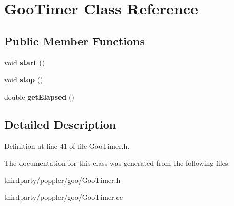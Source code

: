 \hypertarget{class_goo_timer}{}\section{Goo\+Timer Class Reference}
\label{class_goo_timer}
\subsection*{Public Member Functions}
\begin{DoxyCompactItemize}
\item 
\mbox{\label{class_goo_timer_aac9f117fa4582dadb5240af2f3c1c52c}} 
void {\bfseries start} ()
\item 
\mbox{\label{class_goo_timer_af578544e4f4e170de32ddf425a4fc600}} 
void {\bfseries stop} ()
\item 
\mbox{\label{class_goo_timer_aa668bc9415ca5883d6bf17e8c678a11f}} 
double {\bfseries get\+Elapsed} ()
\end{DoxyCompactItemize}


\subsection{Detailed Description}


Definition at line 41 of file Goo\+Timer.\+h.



The documentation for this class was generated from the following files\+:\begin{DoxyCompactItemize}
\item 
thirdparty/poppler/goo/Goo\+Timer.\+h\item 
thirdparty/poppler/goo/Goo\+Timer.\+cc\end{DoxyCompactItemize}
